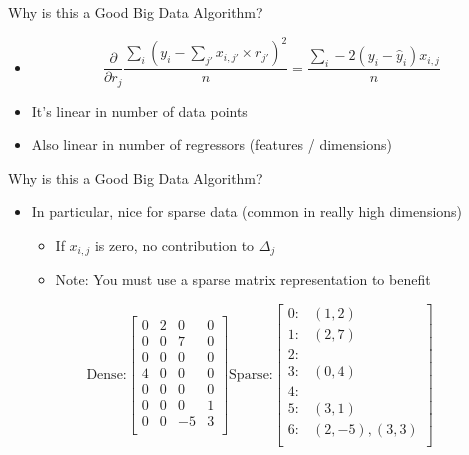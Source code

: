 \documentclass[aspectratio=169]{beamer}
\begin{document}
\begin{frame}{Why is this a Good Big Data Algorithm?}

\begin{itemize}
\item[] $$\frac{\partial}{\partial r_j}\frac{ \sum_i (y_i - \sum_{j'} x_{i,j'} \times r_{j'})^2}{n} = \frac{\sum_i -2(y_i - \hat{y}_i) x_{i,j}}{n}$$
\item It's linear in number of data points
\item Also linear in number of regressors (features / dimensions)
\end{itemize}
\end{frame}
\begin{frame}{Why is this a Good Big Data Algorithm?}

\begin{itemize}
\item In particular, nice for sparse data (common in really high dimensions)
	\begin{itemize}
	\item If $x_{i,j}$ is zero, no contribution to $\Delta_j$
	\item Note: You must use a sparse matrix representation to benefit
	\end{itemize}
\end{itemize}
\[
\textrm{Dense:}
 \begin{bmatrix} 
	0&2 &0& 0	\\
	0&0 &7& 0	\\
	0&0 &0& 0	\\
	4&0 &0& 0	\\
	0&0 &0& 0	\\
	0&0 &0& 1	\\
	0&0 &-5 & 3	\\
\end{bmatrix} 
\textrm{Sparse:}
 \begin{bmatrix} 
	0:& (1,2)	\\
	1:& (2,7)	\\
	2:&	\\
	3:&(0,4)	\\
	4: &	\\
	5:&(3,1)	\\
	6:&(2, -5), (3, 3)	\\
\end{bmatrix} 
\]
\end{frame}
\end{document}
